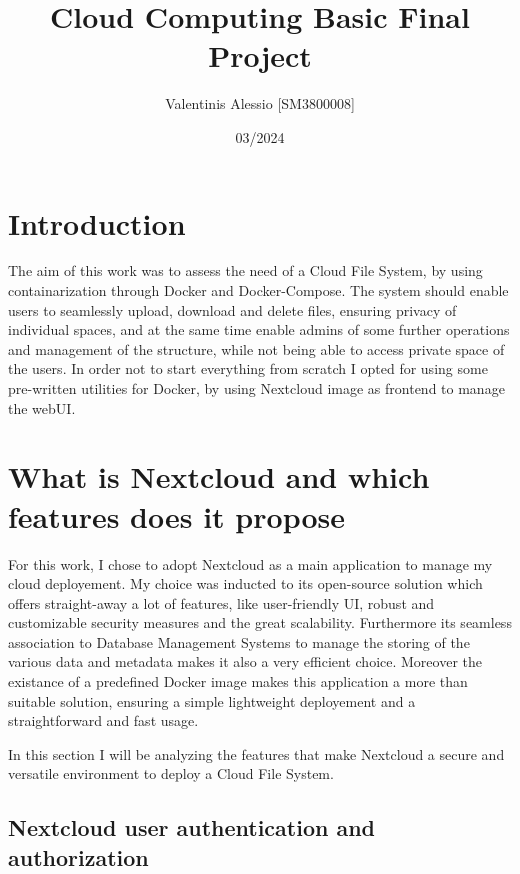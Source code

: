 \documentclass{article}
\title{Cloud Computing Basic Final Project}
\author{Valentinis Alessio [SM3800008]}
\date{03/2024}
\begin{document}
	\maketitle
	\tableofcontents
	
	\section{Introduction}
	The aim of this work was to assess the need of a Cloud File System, by using containarization through Docker and Docker-Compose. The system should enable users to seamlessly upload, download and delete files, ensuring privacy of individual spaces, and at the same time enable admins of some further operations and management of the structure, while not being able to access private space of the users. In order not to start everything from scratch I opted for using some pre-written utilities for Docker, by using Nextcloud image as frontend to manage the webUI.
	
	\section{What is Nextcloud and which features does it propose}
	For this work, I chose to adopt Nextcloud as a main application to manage my cloud deployement. My choice was inducted to its open-source solution which offers straight-away a lot of features, like user-friendly UI, robust and customizable security measures and the great scalability. Furthermore its seamless association to Database Management Systems to manage the storing of the various data and metadata makes it also a very efficient choice. Moreover the existance of a predefined Docker image makes this application a more than suitable solution, ensuring a simple lightweight deployement and a straightforward and fast usage.
	
	In this section I will be analyzing the features that make Nextcloud a secure and versatile environment to deploy a Cloud File System.
	
	\subsection{Nextcloud user authentication and authorization}
	
\end{document}
